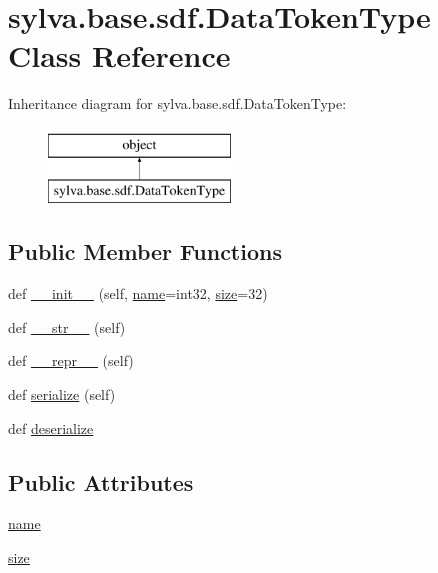 \hypertarget{classsylva_1_1base_1_1sdf_1_1_data_token_type}{}\section{sylva.\+base.\+sdf.\+Data\+Token\+Type Class Reference}
\label{classsylva_1_1base_1_1sdf_1_1_data_token_type}
Inheritance diagram for sylva.\+base.\+sdf.\+Data\+Token\+Type\+:\begin{figure}[H]
\begin{center}
\leavevmode
\includegraphics[height=2.000000cm]{classsylva_1_1base_1_1sdf_1_1_data_token_type}
\end{center}
\end{figure}
\subsection*{Public Member Functions}
\begin{DoxyCompactItemize}
\item 
def \hyperlink{classsylva_1_1base_1_1sdf_1_1_data_token_type_add78d9084e28521d9c7fa6a334d2f6ec}{\+\_\+\+\_\+init\+\_\+\+\_\+} (self, \hyperlink{classsylva_1_1base_1_1sdf_1_1_data_token_type_a64214bba14fcba747fd608caef007924}{name}=\textquotesingle{}int32\textquotesingle{}, \hyperlink{classsylva_1_1base_1_1sdf_1_1_data_token_type_abf397c07db4eced64bf773de13fcbbf0}{size}=32)
\item 
def \hyperlink{classsylva_1_1base_1_1sdf_1_1_data_token_type_ab44771f0368f95e63030117f12b7e36d}{\+\_\+\+\_\+str\+\_\+\+\_\+} (self)
\item 
def \hyperlink{classsylva_1_1base_1_1sdf_1_1_data_token_type_ad125c88296f6af2f66c19a4c70513bbc}{\+\_\+\+\_\+repr\+\_\+\+\_\+} (self)
\item 
def \hyperlink{classsylva_1_1base_1_1sdf_1_1_data_token_type_afa649c12af7f700e3c1f90b02e100d75}{serialize} (self)
\item 
def \hyperlink{classsylva_1_1base_1_1sdf_1_1_data_token_type_a67288003df4678e9cb206773551a17c7}{deserialize}
\end{DoxyCompactItemize}
\subsection*{Public Attributes}
\begin{DoxyCompactItemize}
\item 
\hyperlink{classsylva_1_1base_1_1sdf_1_1_data_token_type_a64214bba14fcba747fd608caef007924}{name}
\item 
\hyperlink{classsylva_1_1base_1_1sdf_1_1_data_token_type_abf397c07db4eced64bf773de13fcbbf0}{size}
\end{DoxyCompactItemize}


